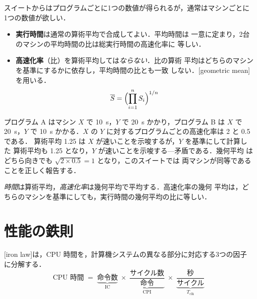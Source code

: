 \documentclass[../main.tex]{subfiles}
\begin{document}
スイートからはプログラムごとに1つの数値が得られるが，通常はマシンごとに
1つの数値が欲しい．

\begin{itemize}
  \item \textbf{実行時間}は通常の算術平均で合成してよい．平均時間は
    一意に定まり，2台のマシンの平均時間の比は総実行時間の高速化率に
    等しい．
  \item \textbf{高速化率}（比）を算術平均しては\emph{ならない}．比の算術
    平均はどちらのマシンを基準にするかに依存し，平均時間の比とも一致
    しない．[geometric mean]を用いる．
    \begin{equation}
      \overline{S} = \Bigl(\prod_{i=1}^{n} S_i\Bigr)^{1/n}
      \label{eq:geomean}
    \end{equation}
\end{itemize}

\begin{example}
  プログラム A はマシン $X$ で \SI{10}{\second}，$Y$ で \SI{20}{\second}
  かかり，プログラム B は $X$ で \SI{20}{\second}，$Y$ で \SI{10}{\second}
  かかる．$X$ の $Y$ に対するプログラムごとの高速化率は 2 と 0.5 である．
  算術平均 1.25 は $X$ が速いことを示唆するが，$Y$ を基準にして計算した
  算術平均も 1.25 となり，$Y$ が速いことを示唆する---矛盾である．幾何平均
  はどちら向きでも $\sqrt{2\times 0.5} = 1$ となり，このスイートでは
  両マシンが同等であることを正しく報告する．
\end{example}


\begin{keypoint}
  \emph{時間}は算術平均，\emph{高速化率}は幾何平均で平均する．高速化率の幾何
  平均は，どちらのマシンを基準にしても，実行時間の幾何平均の比に等しい．
\end{keypoint}

\section{性能の鉄則}

[iron law]は，CPU
時間を，計算機システムの異なる部分に対応する3つの因子に分解する．
\begin{equation}
  \text{CPU 時間}
  \;=\; \underbrace{\text{命令数}}_{\text{IC}}
  \;\times\; \underbrace{\frac{\text{サイクル数}}{\text{命令}}}_{\text{CPI}}
  \;\times\; \underbrace{\frac{\text{秒}}{\text{サイクル}}}_{T_{\mathrm{clk}}}
  \label{eq:iron-law}
\end{equation}
\end{document}
